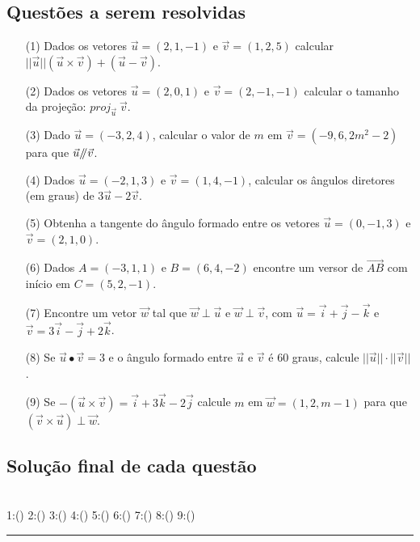 \begin{snugshade}
	\section*{Questões a serem resolvidas}
\end{snugshade}

\begin{itemize}
	\item [(1)] Dados os vetores $\vec{u}=(2,1,-1)$ e $\vec{v}=(1,2,5)$ calcular $||\vec{u}||(\vec{u}\times\vec{v})+(\vec{u}-\vec{v})$.
	\item [(2)] Dados os vetores $\vec{u}=(2,0,1)$ e $\vec{v}=(2,-1,-1)$ calcular o tamanho da projeção: $proj_{\vec{u}}\ \vec{v}$.
	\item [(3)] Dado $\vec{u}=(-3,2,4)$, calcular o valor de $m$ em $\vec{v}=(-9,6,2m^2-2)$ para que $\vec{u}/\hspace{-0.1cm}/\vec{v}$.
	\item [(4)] Dados $\vec{u}=(-2,1,3)$  e $\vec{v}=(1,4,-1)$, calcular os ângulos diretores (em graus) de $3\vec{u}-2\vec{v}$.
	\item [(5)] Obtenha a tangente do ângulo formado entre os vetores $\vec{u}=(0,-1,3)$ e $\vec{v}=(2,1,0)$. 
	\item [(6)] Dados $A=(-3,1,1)$ e $B=(6,4,-2)$ encontre um versor de $\vec{AB}$ com  início em $C=(5,2,-1)$.
	\item [(7)] Encontre um vetor $\vec{w}$ tal que $\vec{w}\perp\vec{u}$ e $\vec{w}\perp\vec{v}$, com $\vec{u}=\vec{i}+\vec{j}-\vec{k}$ e $\vec{v}=3\vec{i}-\vec{j}+2\vec{k}$.
	\item [(8)] Se $\vec{u}\bullet\vec{v}=3$ e o ângulo formado entre $\vec{u}$ e $\vec{v}$ é 60 graus, calcule $||\vec{u}||\cdot||\vec{v}||$.
	\item [(9)] Se $-(\vec{u}\times\vec{v})=\vec{i}+3\vec{k}-2\vec{j}$ calcule $m$ em $\vec{w}=(1,2,m-1)$ para que $(\vec{v}\times\vec{u})\perp\vec{w}$. 
\end{itemize}
	
\begin{snugshade}
	\section*{Solução final de cada questão}
\end{snugshade}
\noindent\\
1:\Bigg(\hspace{5cm}\Bigg)
2:\Bigg(\hspace{5cm}\Bigg)
3:\Bigg(\hspace{5cm}\Bigg)
4:\Bigg(\hspace{5cm}\Bigg)
5:\Bigg(\hspace{5cm}\Bigg)
6:\Bigg(\hspace{5cm}\Bigg)
7:\Bigg(\hspace{5cm}\Bigg)
8:\Bigg(\hspace{5cm}\Bigg)
9:\Bigg(\hspace{5cm}\Bigg)
\\
\vspace{0.5cm}
\hrule
\newpage
